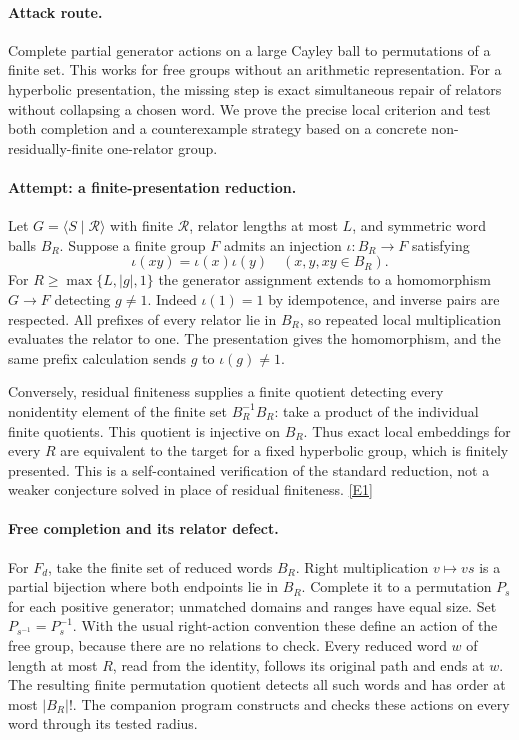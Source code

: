 \documentclass[11pt,a4paper]{article}
\newcommand{\eref}[2]{\hyperlink{extra:#1:#2}{[E#2]}}
\numberwithin{equation}{section}
\begin{document}
\paragraph{Attack route.}
Complete partial generator actions on a large Cayley ball to permutations
of a finite set. This works for free groups without an arithmetic
representation. For a hyperbolic presentation, the missing step is exact
simultaneous repair of relators without collapsing a chosen word. We prove
the precise local criterion and test both completion and a counterexample
strategy based on a concrete non-residually-finite one-relator group.

\paragraph{Attempt: a finite-presentation reduction.}
Let $G=\langle S\mid\mathcal R\rangle$ with finite $\mathcal R$, relator
lengths at most $L$, and symmetric word balls $B_R$. Suppose a finite group
$F$ admits an injection $\iota:B_R\to F$ satisfying
\[
 \iota(xy)=\iota(x)\iota(y)\quad(x,y,xy\in B_R).
\]
For $R\ge\max\{L,|g|,1\}$ the generator assignment extends to a homomorphism
$G\to F$ detecting $g\ne1$. Indeed $\iota(1)=1$ by idempotence, and
inverse pairs are respected. All prefixes of every relator lie in $B_R$,
so repeated local multiplication evaluates the relator to one. The
presentation gives the homomorphism, and the same prefix calculation sends
$g$ to $\iota(g)\ne1$.

Conversely, residual finiteness supplies a finite quotient detecting every
nonidentity element of the finite set $B_R^{-1}B_R$: take a product of the
individual finite quotients. This quotient is injective on $B_R$. Thus exact
local embeddings for every $R$ are equivalent to the target for a fixed
hyperbolic group, which is finitely presented. This is a self-contained
verification of the standard reduction, not a weaker conjecture solved
in place of residual finiteness. \eref{statement}{1}

\paragraph{Free completion and its relator defect.}
For $F_d$, take the finite set of reduced words $B_R$. Right multiplication
$v\mapsto vs$ is a partial bijection where both endpoints lie in $B_R$.
Complete it to a permutation $P_s$ for each positive generator; unmatched
domains and ranges have equal size. Set $P_{s^{-1}}=P_s^{-1}$. With the
usual right-action convention these define an action of the free group,
because there are no relations to check. Every reduced word $w$ of length
at most $R$, read from the identity, follows its original path and ends at
$w$. The resulting finite permutation quotient detects all such words and
has order at most $|B_R|!$. The companion program constructs and checks
these actions on every word through its tested radius.
\end{document}
